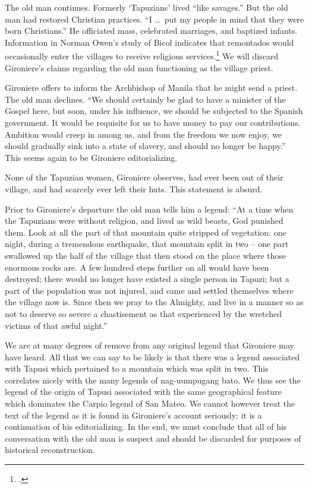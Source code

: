 The old man continues. Formerly \enquote*{Tapuzians} lived \enquote{like savages.} But the old man had restored Christian practices. \enquote{I \ldots\ put my people in mind that they were born Christians.} He officiated mass, celebrated marriages, and baptized infants. Information in Norman Owen's study of Bicol indicates that remontados would occasionally enter the villages to receive religious services.\footcite{Owen1984} We will discard Gironiere's claims regarding the old man functioning as the village priest.

Gironiere offers to inform the Archbishop of Manila that he might send a priest. The old man declines. \enquote{We should certainly be glad to have a minister of the Gospel here, but soon, under his influence, we should be subjected to the Spanish government. It would be requisite for us to have money to pay our contributions. Ambition would creep in among us, and from the freedom we now enjoy, we should gradually sink into a state of slavery, and should no longer be happy.} This seems again to be Gironiere editorializing.

None of the Tapuzian women, Gironiere observes, had ever been out of their village, and had scarcely ever left their huts. This statement is absurd.

Prior to Gironiere's departure the old man tells him a legend: \enquote{At a time when the Tapuzians were without religion, and lived as wild beasts, God punished them. Look at all the part of that mountain quite stripped of vegetation: one night, during a tremendous earthquake, that mountain split in two -- one part swallowed up the half of the village that then stood on the place where those enormous rocks are. A few hundred steps further on all would have been destroyed; there would no longer have existed a single person in Tapuzi; but a part of the population was not injured, and came and settled themselves where the village now is. Since then we pray to the Almighty, and live in a manner so as not to deserve so severe a chastisement as that experienced by the wretched victims of that awful night.}

We are at many degrees of remove from any original legend that Gironiere may have heard. All that we can say to be likely is that there was a legend associated with Tapusi which pertained to a mountain which was split in two. This correlates nicely with the many legends of nag-uumpugang bato. We thus see the legend of the origin of Tapusi associated with the same geographical feature which dominates the Carpio legend of San Mateo. We cannot however treat the text of the legend as it is found in Gironiere’s account seriously; it is a continuation of his editorializing. In the end, we must conclude that all of his conversation with the old man is suspect and should be discarded for purposes of historical reconstruction.

